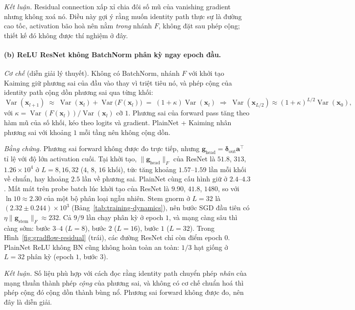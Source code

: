 \emph{Kết luận.} Residual connection xấp xỉ chia đôi số mũ của vanishing gradient
nhưng không xoá nó. Điều này gợi ý rằng muốn identity path thực sự là đường cao tốc, activation
bão hoà nên nằm \emph{trong} nhánh $F$, không đặt sau phép cộng; thiết kế đó không được thí nghiệm ở đây.

\paragraph{(b) ReLU ResNet không BatchNorm phân kỳ ngay epoch đầu.}
\emph{Cơ chế} (diễn giải lý thuyết). Không có BatchNorm, nhánh $F$ với khởi tạo Kaiming giữ phương sai
của đầu vào thay vì triệt tiêu nó, và phép cộng của identity path cộng dồn
phương sai qua từng khối:
\[
  \operatorname{Var}(\mathbf{x}_{l+1}) \;\approx\;
  \operatorname{Var}(\mathbf{x}_l) + \operatorname{Var}\big(F(\mathbf{x}_l)\big)
  \;=\; (1+\kappa)\operatorname{Var}(\mathbf{x}_l)
  \;\Longrightarrow\;
  \operatorname{Var}(\mathbf{x}_{L/2}) \approx (1+\kappa)^{L/2}\operatorname{Var}(\mathbf{x}_0),
\]
với $\kappa=\operatorname{Var}(F(\mathbf{x}_l))/\operatorname{Var}(\mathbf{x}_l)$
cỡ $1$. Phương sai của forward pass tăng theo hàm mũ của số khối, kéo theo
logits và gradient. PlainNet + Kaiming nhân phương sai với khoảng $1$ mỗi tầng
nên không cộng dồn.

\emph{Bằng chứng.} Phương sai forward không được đo trực tiếp, nhưng
$\mathbf{g}_{\text{head}} = \boldsymbol{\delta}_{\text{out}}\mathbf{a}^{\top}$ tỉ
lệ với độ lớn activation cuối. Tại khởi tạo, $\|\mathbf{g}_{\text{head}}\|_F$ của
ResNet là $51.8$, $313$, $1.26\times10^{4}$ ở $L=8,16,32$ ($4$, $8$, $16$ khối),
tức tăng khoảng $1.57$--$1.59$ lần mỗi khối về chuẩn, hay khoảng $2.5$ lần về
phương sai. PlainNet cùng cấu hình giữ ở $2.4$--$4.3$. Mất mát trên probe batch
lúc khởi tạo của ResNet là $9.90$, $41.8$, $1480$, so với $\ln 10\approx2.30$ của
một bộ phân loại ngẫu nhiên. Stem gnorm ở $L=32$ là $(2.32\pm0.244)\times10^{3}$
(Bảng~\ref{tab:training-dynamics}), nên bước SGD đầu tiên có
$\eta\|\mathbf{g}_{\text{stem}}\|_F\approx232$. Cả $9/9$ lần chạy phân kỳ
ở epoch $1$, và mạng càng sâu thì càng sớm: bước $3$--$4$ ($L=8$), bước $2$
($L=16$), bước $1$ ($L=32$). Trong Hình~\ref{fig:gradflow-residual} (trái), các
đường ResNet chỉ còn điểm epoch $0$. PlainNet ReLU không BN cũng không hoàn toàn
an toàn: $1/3$ hạt giống ở $L=32$ phân kỳ (epoch $1$, bước $3$).

\emph{Kết luận.} Số liệu phù hợp với cách đọc rằng identity path chuyển phép \emph{nhân} của
mạng thuần thành phép \emph{cộng} của phương sai, và không có cơ chế chuẩn hoá thì phép cộng đó cộng
dồn thành bùng nổ. Phương sai forward không được đo, nên đây là diễn giải.

